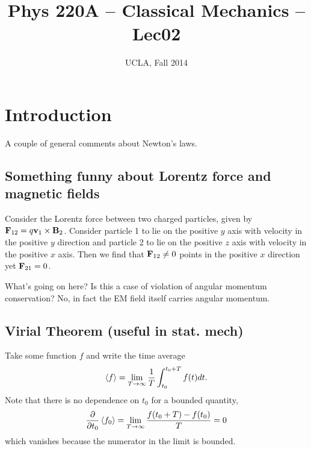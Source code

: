 


\title{Phys 220A -- Classical Mechanics -- Lec02}
\author{UCLA, Fall 2014}


\setlength{\unitlength}{1mm}
\maketitle


\section{Introduction}

A couple of general comments about Newton's laws. 

\subsection{Something funny about Lorentz force and magnetic fields}

Consider the Lorentz force between two charged particles, given by $\mathbf{F}_{12} = q \mathbf{v}_1 \times \mathbf{B}_2$. Consider particle 1 to lie on the positive $y$ axis with velocity in the positive $y$ direction and particle 2 to lie on the positive $z$ axis with velocity in the positive $x$ axis. Then we find that $\mathbf{F}_{12} \neq 0$ points in the positive $x$ direction yet $\mathbf{F}_{21} = 0$. 

What's going on here? Is this a case of violation of angular momentum conservation? No, in fact the EM field itself carries angular momentum. 


\subsection{Virial Theorem (useful in stat. mech)}

Take some function $f$ and write the time average
\begin{equation}
\left< f \right> = \lim_{T \rightarrow \infty} \frac{1}{T} \int_{t_0}^{t_0 + T} f(t) dt.
\end{equation}
Note that there is no dependence on $t_0$ for a bounded quantity,
\begin{equation}
\frac{\partial }{\partial t_0} \left< f_0 \right> = \lim_{T \rightarrow \infty} \frac{f(t_0 + T) - f(t_0)}{T} = 0
\end{equation}
which vanishes because the numerator in the limit is bounded. 

